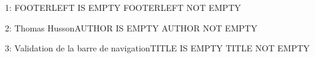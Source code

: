 \documentclass{scrartcl}
\def\hussondoctitle{Validation de la barre de navigation}
\def\hussondocauthor{Thomas Husson}
\providecommand{\hussondocfooterleft}{}
\begin{document}
1: \ifx\hussondocfooterleft\@empty FOOTERLEFT IS EMPTY \else FOOTERLEFT NOT EMPTY \fi

2: \ifx\hussondocauthor\@empty AUTHOR IS EMPTY \else AUTHOR NOT EMPTY \fi

3: \ifx\hussondoctitle\@empty TITLE IS EMPTY \else TITLE NOT EMPTY \fi
\end{document}
